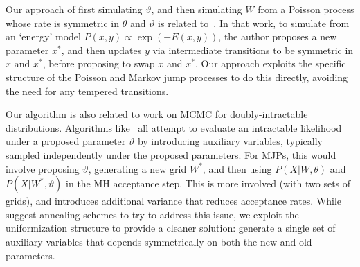 Our approach of first simulating $\vartheta$, and then simulating $W$ from a Poisson process whose rate is symmetric in $\theta$ and $\vartheta$ is related to~\citet{Neal04Drag}. In that work, to simulate from an `energy' model $P(x,y) \propto \exp(-E(x,y))$, the author proposes a new parameter $x^*$, and then updates $y$ via intermediate transitions to be symmetric in $x$ and $x^*$, before proposing to swap $x$ and $x^*$. Our approach exploits the specific structure of the Poisson and Markov jump processes to do this directly, avoiding the need for any tempered transitions. 

Our algorithm is also related to work on MCMC for doubly-intractable distributions.  Algorithms like~\cite{Moller2006,murray2006,Andrieu09} all attempt to evaluate an intractable likelihood under a proposed parameter $\vartheta$ by introducing auxiliary variables, typically sampled independently under the proposed parameters. 
For MJPs, this would involve proposing $\vartheta$, generating a new grid $W^*$, and then using $P(X|W,\theta)$ and $P(X|W^*,\vartheta)$ in the MH acceptance step. 
This is more involved (with two sets of grids), and introduces additional variance that reduces acceptance rates. %
While~\cite{murray2006} suggest annealing schemes to try to address this issue, we exploit the uniformization structure to provide a cleaner solution: generate a single set of auxiliary variables that depends symmetrically on both the new and old parameters. 
